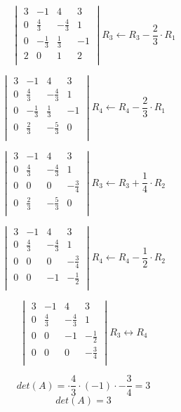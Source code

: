 \documentclass[a4paper, 11pt]{article}
\begin{document}
$$
\phantom{A = }
\begin{vmatrix}
3 & -1 & 4 & 3 \\ 
0 & \frac{4}{3} & -\frac{4}{3} & 1 \\ 
0 & -\frac{1}{3} & \frac{1}{3} & -1 \\
2 & 0 & 1 & 2 \\ 
\end{vmatrix}
R_3 \leftarrow R_3-\frac{2}{3} \cdot R_1
$$

$$
\begin{vmatrix}
3 & -1 & 4 & 3 \\ 
0 & \frac{4}{3} & -\frac{4}{3} & 1 \\ 
0 & -\frac{1}{3} & \frac{1}{3} & -1 \\
0 & \frac{2}{3} & -\frac{5}{3} & 0 \\ 
\end{vmatrix}
R_4 \leftarrow R_4-\frac{2}{3} \cdot R_1
$$

$$
\begin{vmatrix}
3 & -1 & 4 & 3 \\ 
0 & \frac{4}{3} & -\frac{4}{3} & 1 \\ 
0 & 0 & 0 & -\frac{3}{4} \\
0 & \frac{2}{3} & -\frac{5}{3} & 0 \\ 
\end{vmatrix}
R_3 \leftarrow R_3+\frac{1}{4} \cdot R_2
$$

$$
\begin{vmatrix}
3 & -1 & 4 & 3 \\ 
0 & \frac{4}{3} & -\frac{4}{3} & 1 \\ 
0 & 0 & 0 & -\frac{3}{4} \\
0 & 0 & -1 & -\frac{1}{2} \\ 
\end{vmatrix}
R_4 \leftarrow R_4-\frac{1}{2} \cdot R_2
$$

$$
\begin{vmatrix}
3 & -1 & 4 & 3 \\ 
0 & \frac{4}{3} & -\frac{4}{3} & 1 \\ 
0 & 0 & -1 & -\frac{1}{2} \\
0 & 0 & 0 & -\frac{3}{4} \\ 
\end{vmatrix}
R_3 \leftrightarrow R_4
$$

$$det(A) = \cdot \frac{4}{3} \cdot (-1) \cdot -\frac{3}{4} = 3$$
$$det(A) = 3$$
\end{document}
